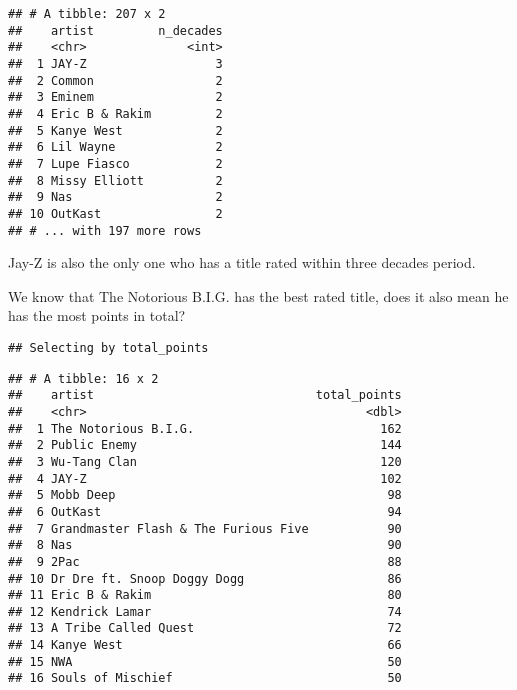 \documentclass[
]{article}
\newenvironment{Shaded}{\begin{snugshade}}{\end{snugshade}}
\newcommand{\DataTypeTok}[1]{\textcolor[rgb]{0.13,0.29,0.53}{#1}}
\newcommand{\DecValTok}[1]{\textcolor[rgb]{0.00,0.00,0.81}{#1}}
\newcommand{\KeywordTok}[1]{\textcolor[rgb]{0.13,0.29,0.53}{\textbf{#1}}}
\newcommand{\NormalTok}[1]{#1}
\newcommand{\OperatorTok}[1]{\textcolor[rgb]{0.81,0.36,0.00}{\textbf{#1}}}
\newcommand{\StringTok}[1]{\textcolor[rgb]{0.31,0.60,0.02}{#1}}
\begin{document}
\begin{verbatim}
## # A tibble: 207 x 2
##    artist         n_decades
##    <chr>              <int>
##  1 JAY-Z                  3
##  2 Common                 2
##  3 Eminem                 2
##  4 Eric B & Rakim         2
##  5 Kanye West             2
##  6 Lil Wayne              2
##  7 Lupe Fiasco            2
##  8 Missy Elliott          2
##  9 Nas                    2
## 10 OutKast                2
## # ... with 197 more rows
\end{verbatim}

Jay-Z is also the only one who has a title rated within three decades
period.

We know that The Notorious B.I.G. has the best rated title, does it also
mean he has the most points in total?

\begin{Shaded}
\end{Shaded}

\begin{verbatim}
## Selecting by total_points
\end{verbatim}

\begin{verbatim}
## # A tibble: 16 x 2
##    artist                               total_points
##    <chr>                                       <dbl>
##  1 The Notorious B.I.G.                          162
##  2 Public Enemy                                  144
##  3 Wu-Tang Clan                                  120
##  4 JAY-Z                                         102
##  5 Mobb Deep                                      98
##  6 OutKast                                        94
##  7 Grandmaster Flash & The Furious Five           90
##  8 Nas                                            90
##  9 2Pac                                           88
## 10 Dr Dre ft. Snoop Doggy Dogg                    86
## 11 Eric B & Rakim                                 80
## 12 Kendrick Lamar                                 74
## 13 A Tribe Called Quest                           72
## 14 Kanye West                                     66
## 15 NWA                                            50
## 16 Souls of Mischief                              50
\end{verbatim}
\end{document}
